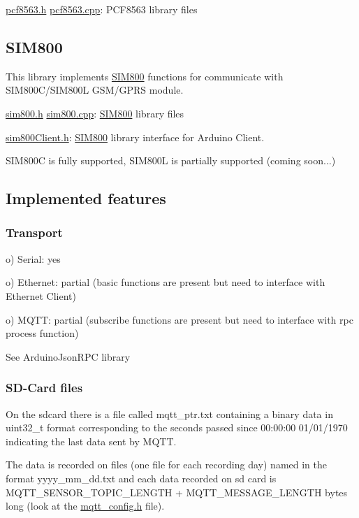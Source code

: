 \hyperlink{pcf8563_8h}{pcf8563.\+h} \hyperlink{pcf8563_8cpp}{pcf8563.\+cpp}\+: P\+C\+F8563 library files\hypertarget{index_sim800}{}\subsection{S\+I\+M800}\label{index_sim800}
This library implements \hyperlink{classSIM800}{S\+I\+M800} functions for communicate with S\+I\+M800\+C/\+S\+I\+M800L G\+S\+M/\+G\+P\+RS module.

\hyperlink{sim800_8h}{sim800.\+h} \hyperlink{sim800_8cpp}{sim800.\+cpp}\+: \hyperlink{classSIM800}{S\+I\+M800} library files

\hyperlink{sim800Client_8h}{sim800\+Client.\+h}\+: \hyperlink{classSIM800}{S\+I\+M800} library interface for Arduino Client.

S\+I\+M800C is fully supported, S\+I\+M800L is partially supported (coming soon...)\hypertarget{index_implemented}{}\subsection{Implemented features}\label{index_implemented}
\hypertarget{index_transport}{}\subsubsection{Transport}\label{index_transport}
o) Serial\+: yes

o) Ethernet\+: partial (basic functions are present but need to interface with Ethernet Client)

o) M\+Q\+TT\+: partial (subscribe functions are present but need to interface with rpc process function)

See Arduino\+Json\+R\+PC library\hypertarget{index_files}{}\subsubsection{S\+D-\/\+Card files}\label{index_files}
On the sdcard there is a file called mqtt\+\_\+ptr.\+txt containing a binary data in uint32\+\_\+t format corresponding to the seconds passed since 00\+:00\+:00 01/01/1970 indicating the last data sent by M\+Q\+TT.

The data is recorded on files (one file for each recording day) named in the format yyyy\+\_\+mm\+\_\+dd.\+txt and each data recorded on sd card is M\+Q\+T\+T\+\_\+\+S\+E\+N\+S\+O\+R\+\_\+\+T\+O\+P\+I\+C\+\_\+\+L\+E\+N\+G\+TH + M\+Q\+T\+T\+\_\+\+M\+E\+S\+S\+A\+G\+E\+\_\+\+L\+E\+N\+G\+TH bytes long (look at the \hyperlink{mqtt__config_8h}{mqtt\+\_\+config.\+h} file).

